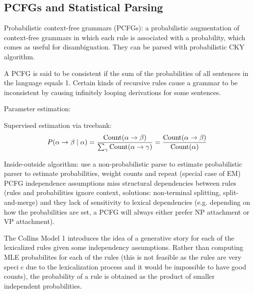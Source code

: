 \documentclass[12pt]{article}
\begin{document}
\subsection{PCFGs and Statistical Parsing}
Probabilistic context-free grammars (PCFGs): a probabilistic augmentation of context-free grammars in which each rule is associated with a probability, which comes as useful for disambiguation. They can be parsed with probabilistic CKY algorithm.
\par A PCFG is said to be consistent if the sum of the probabilities of all sentences in the language equals 1. Certain kinds of recursive rules cause a grammar to be inconsistent by causing infinitely looping derivations for some sentences.
\par Parameter estimation:
\ulb
\item Supervised estimation via treebank:
\[ P(\alpha\rightarrow\beta\mid\alpha) = \frac{\text{Count}(\alpha\rightarrow\beta)}{\sum_{\gamma}\text{Count}(\alpha\rightarrow\gamma)} = \frac{\text{Count}(\alpha\rightarrow\beta)}{\text{Count}(\alpha)} \]
\item Inside-outside algorithm: use a non-probabilistic parse to estimate probabilistic parser to estimate probabilities, weight counts and repeat (special case of EM)
\ule
PCFG independence assumptions miss structural dependencies between rules (rules and probabilities ignore context, solutions: non-terminal splitting, split-and-merge) and they lack of sensitivity to lexical dependencies (e.g. depending on how the probabilities are set, a PCFG will always either prefer NP attachment or VP attachment).
\par The Collins Model 1 introduces the idea of a generative story for each of the lexicalized rules given some independency assumptions. Rather than computing MLE probabilites for each of the rules (this is not feasible as the rules are very specic due to the lexicalization process and it would be impossible to have good counts), the probability of a rule is obtained as the product of smaller independent probabilities.
\end{document}
